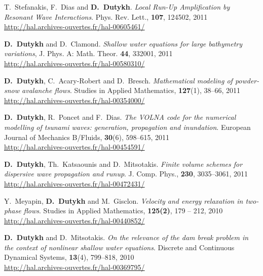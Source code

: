 \begin{etaremune}
  \item T.~Stefanakis, F.~Dias and \textbf{D.~Dutykh}. \textit{Local Run-Up Amplification by Resonant Wave Interactions}. Phys. Rev. Lett., \textbf{107}, 124502, 2011 \\ %
  \url{http://hal.archives-ouvertes.fr/hal-00605461/}
  
  \item \textbf{D.~Dutykh} and D.~Clamond. \textit{Shallow water equations for large bathymetry variations}, J. Phys. A: Math. Theor. \textbf{44}, 332001, 2011 \\ %
  \url{http://hal.archives-ouvertes.fr/hal-00580310/}
      
  \item \textbf{D.~Dutykh}, C.~Acary-Robert and D.~Bresch. \textit{Mathematical modeling of powder-snow avalanche flows}. Studies in Applied Mathematics, \textbf{127}(1), 38--66, 2011 \\ %
  \url{http://hal.archives-ouvertes.fr/hal-00354000/}

  \item \textbf{D.~Dutykh}, R.~Poncet and F.~Dias. \textit{The VOLNA code for the numerical modelling of tsunami waves: generation, propagation and inundation}. European Journal of Mechanics B/Fluids, \textbf{30}(6), 598--615, 2011 \\ %
  \url{http://hal.archives-ouvertes.fr/hal-00454591/}
    
  \item \textbf{D.~Dutykh}, Th.~Katsaounis and D.~Mitsotakis. \textit{Finite volume schemes for dispersive wave propagation and runup}. J. Comp. Phys., \textbf{230}, 3035--3061, 2011 \\ %
  \url{http://hal.archives-ouvertes.fr/hal-00472431/}
  
  
  \item Y.~Meyapin, \textbf{D.~Dutykh} and M.~Gisclon. \textit{Velocity and energy relaxation in two-phase flows}. Studies in Applied Mathematics, \textbf{125(2)}, 179 -- 212, 2010 \\ %
  \url{http://hal.archives-ouvertes.fr/hal-00440852/}

  \item \textbf{D.~Dutykh} and D.~Mitsotakis. \textit{On the relevance of the dam break problem in the context of nonlinear shallow water equations}. Discrete and Continuous Dynamical Systems, \textbf{13}(4), 799--818, 2010 \\ %
  \url{http://hal.archives-ouvertes.fr/hal-00369795/}
  

\end{etaremune}
